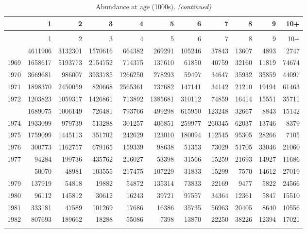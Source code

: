 \documentclass[
]{article}
\begin{document}
\begin{longtable}[t]{lrrrrrrrrrr}
\caption{\label{tab:NAA-table}Abundance at age (1000s).}\\
\toprule
  & 1 & 2 & 3 & 4 & 5 & 6 & 7 & 8 & 9 & 10+\\
\midrule
\endfirsthead
\caption[]{Abundance at age (1000s). \textit{(continued)}}\\
\toprule
  & 1 & 2 & 3 & 4 & 5 & 6 & 7 & 8 & 9 & 10+\\
\midrule
\endhead

\endfoot
\bottomrule
\endlastfoot
1968 & 4611906 & 3132301 & 1570616 & 664382 & 269291 & 105246 & 37843 & 13607 & 4893 & 2747\\
1969 & 1658617 & 5193773 & 2154752 & 714375 & 137610 & 61850 & 40759 & 32160 & 11819 & 74674\\
1970 & 3669681 & 986007 & 3933785 & 1266250 & 278293 & 59497 & 34647 & 35932 & 35859 & 44097\\
1971 & 1898370 & 2450059 & 820668 & 2565361 & 737682 & 147141 & 34142 & 21210 & 19194 & 61463\\
1972 & 1203823 & 1059317 & 1426861 & 713892 & 1385681 & 310112 & 74859 & 16414 & 15551 & 35711\\
\addlinespace
1973 & 1689075 & 1006149 & 726481 & 793766 & 499298 & 615950 & 123248 & 32667 & 8843 & 15142\\
1974 & 1933099 & 979739 & 513288 & 301257 & 406851 & 259977 & 260345 & 62037 & 13746 & 8379\\
1975 & 1759099 & 1445113 & 351702 & 242629 & 123010 & 180094 & 112545 & 95305 & 28266 & 7105\\
1976 & 300773 & 1162757 & 679165 & 159339 & 98638 & 51353 & 73029 & 51705 & 33046 & 21060\\
1977 & 94284 & 199736 & 435762 & 216027 & 53398 & 31566 & 15259 & 21693 & 14927 & 11686\\
\addlinespace
1978 & 50070 & 48981 & 103555 & 217475 & 107229 & 31833 & 15299 & 7570 & 14612 & 27019\\
1979 & 137919 & 54818 & 19882 & 54872 & 135314 & 73833 & 22169 & 9477 & 5822 & 24566\\
1980 & 96112 & 145812 & 30612 & 16243 & 39721 & 97557 & 34364 & 12361 & 5847 & 15510\\
1981 & 333181 & 47589 & 101269 & 17686 & 16386 & 35735 & 56963 & 20405 & 8640 & 10556\\
1982 & 807693 & 189662 & 18288 & 55086 & 7398 & 13870 & 22250 & 38226 & 12394 & 17021\\
\addlinespace

\end{longtable}
\end{document}
